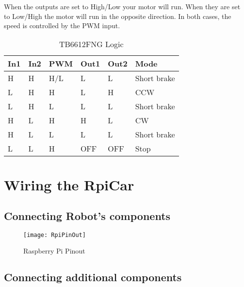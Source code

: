 \documentclass[
12pt, %
a4paper, %
oneside, %
headinclude,footinclude, %
BCOR5mm, %
]{scrartcl}
\begin{document}
When the outputs are set to High/Low your motor will run. When they are set to Low/High the motor will run in the opposite direction. In both cases, the speed is controlled by the PWM input.

\begin{table}[H]
\caption{TB6612FNG Logic}
\centering
\begin{tabular}{llllll}
\toprule
In1  & In2 & PWM & Out1 & Out2 & Mode \\
\midrule
H    & H   & H/L & L    &L     & Short brake\\
L    & H   & H   & L    & H    & CCW\\
L    & H   & L   & L    & L    & Short brake\\
H    & L   & H   & H    & L    & CW\\
H    & L   & L   & L    & L    & Short brake\\
L    & L   & H   & OFF  & OFF  & Stop\\
\bottomrule
\end{tabular}
\label{tab:label}
\end{table}

\section{Wiring the RpiCar}
\subsection{Connecting Robot's components}

\begin{figure}[H]
\centering
\texttt{[image: RpiPinOut]} 
\caption[Raspberry Pi Pinout]{Raspberry Pi Pinout \footnotemark}
\label{fig:Raspberry Pi Pinout}
\end{figure}



\subsection{Connecting additional components}
\end{document}
